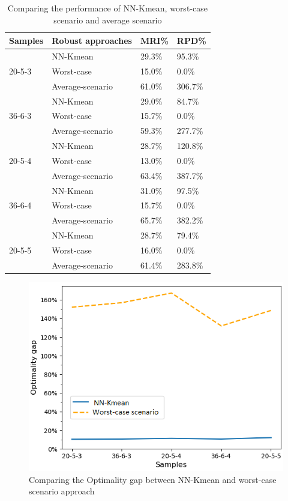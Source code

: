 \documentclass[letterpaper]{article} %
\begin{document}
\begin{table}[t]
\scriptsize
\caption{Comparing the performance of NN-Kmean, worst-case scenario and average scenario}\smallskip
\centering
\begin{tabular}{llll}
\hline
Samples                 & Robust approaches & MRI\%  & RPD\%   \\ \hline
\multirow{3}{*}{20-5-3} & NN-Kmean          & 29.3\% & 95.3\%  \\
                        & Worst-case        & 15.0\% & 0.0\%   \\
                        & Average-scenario  & 61.0\% & 306.7\% \\ \hline
\multirow{3}{*}{36-6-3} & NN-Kmean          & 29.0\% & 84.7\%  \\
                        & Worst-case        & 15.7\% & 0.0\%   \\
                        & Average-scenario  & 59.3\% & 277.7\% \\ \hline
\multirow{3}{*}{20-5-4} & NN-Kmean          & 28.7\% & 120.8\% \\
                        & Worst-case        & 13.0\% & 0.0\%   \\
                        & Average-scenario  & 63.4\% & 387.7\% \\ \hline
\multirow{3}{*}{36-6-4} & NN-Kmean          & 31.0\% & 97.5\%  \\
                        & Worst-case        & 15.7\% & 0.0\%   \\
                        & Average-scenario  & 65.7\% & 382.2\% \\ \hline
\multirow{3}{*}{20-5-5} & NN-Kmean          & 28.7\% & 79.4\%  \\
                        & Worst-case        & 16.0\% & 0.0\%   \\
                        & Average-scenario  & 61.4\% & 283.8\% \\ \hline
\end{tabular}
\end{table}
\begin{figure}[t]
\centering
\includegraphics[width=0.9\columnwidth]{figure/fig7.png} %
\caption{Comparing the Optimality gap between NN-Kmean and worst-case scenario approach}
\label{fig6}
\end{figure}
\end{document}
